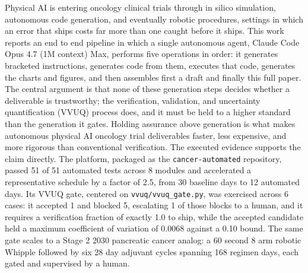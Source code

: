 
Physical AI is entering oncology clinical trials through in silico simulation,
autonomous code generation, and eventually robotic procedures, settings in which
an error that ships costs far more than one caught before it ships. This work
reports an end to end pipeline in which a single autonomous agent, Claude Code
Opus 4.7 (1M context) Max, performs five operations in order: it generates
bracketed instructions, generates code from them, executes that code, generates
the charts and figures, and then assembles first a draft and finally this full
paper. The central argument is that none of these generation steps decides
whether a deliverable is trustworthy; the verification, validation, and
uncertainty quantification (VVUQ) process does, and it must be held to a higher
standard than the generation it gates. Holding assurance above generation is
what makes autonomous physical AI oncology trial deliverables faster, less
expensive, and more rigorous than conventional verification. The executed
evidence supports the claim directly. The platform, packaged as the
\texttt{cancer-automated} repository, passed 51 of 51 automated tests across 8
modules and accelerated a representative schedule by a factor of 2.5, from 30
baseline days to 12 automated days. Its VVUQ gate, centered on
\texttt{vvuq/vvuq\_gate.py}, was exercised across 6 cases: it accepted 1 and
blocked 5, escalating 1 of those blocks to a human, and it requires a
verification fraction of exactly 1.0 to ship, while the accepted candidate held
a maximum coefficient of variation of 0.0068 against a 0.10 bound. The same gate
scales to a Stage 2 2030 pancreatic cancer analog: a 60 second 8 arm robotic
Whipple followed by six 28 day adjuvant cycles spanning 168 regimen days, each
gated and supervised by a human.
